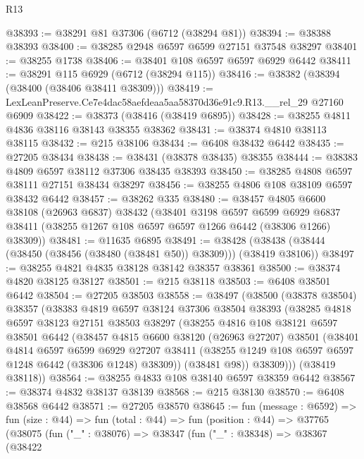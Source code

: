 \begin{lexlean}{R13}
\begin{coremodule}
@38393 := @38291 @81 @37306 (@6712 (@38294 @81))
@38394 := @38388 @38393
@38400 := @38285 @2948 @6597 @6599 @27151 @37548 @38297
@38401 := @38255 @1738
@38406 := @38401 @108 @6597 @6597 @6929 @6442
@38411 := @38291 @115 @6929 (@6712 (@38294 @115))
@38416 := @38382 (@38394 (@38400 (@38406 @38411 @38309)))
@38419 := LexLeanPreserve.Ce7e4dac58aefdeaa5aa58370d36e91c9.R13.__rel_29 @27160 @6909
@38422 := @38373 (@38416 (@38419 @6895))
@38428 := @38255 @4811 @4836 @38116 @38143 @38355 @38362
@38431 := @38374 @4810 @38113 @38115
@38432 := @215 @38106
@38434 := @6408 @38432 @6442
@38435 := @27205 @38434
@38438 := @38431 (@38378 @38435) @38355
@38444 := @38383 @4809 @6597 @38112 @37306 @38435 @38393
@38450 := @38285 @4808 @6597 @38111 @27151 @38434 @38297
@38456 := @38255 @4806 @108 @38109 @6597 @38432 @6442
@38457 := @38262 @335
@38480 := @38457
    @4805
    @6600
    @38108
    (@26963 @6837)
    @38432
    (@38401
      @3198
      @6597
      @6599
      @6929
      @6837
      @38411
      (@38255 @1267 @108 @6597 @6597 @1266 @6442 (@38306 @1266) @38309))
@38481 := @11635 @6895
@38491 := @38428 (@38438 (@38444 (@38450 (@38456 (@38480 (@38481 @50)) @38309))) (@38419 @38106))
@38497 := @38255 @4821 @4835 @38128 @38142 @38357 @38361
@38500 := @38374 @4820 @38125 @38127
@38501 := @215 @38118
@38503 := @6408 @38501 @6442
@38504 := @27205 @38503
@38558 := @38497
    (@38500
      (@38378 @38504)
      @38357
      (@38383
        @4819
        @6597
        @38124
        @37306
        @38504
        @38393
        (@38285
          @4818
          @6597
          @38123
          @27151
          @38503
          @38297
          (@38255
            @4816
            @108
            @38121
            @6597
            @38501
            @6442
            (@38457
              @4815
              @6600
              @38120
              (@26963 @27207)
              @38501
              (@38401
                @4814
                @6597
                @6599
                @6929
                @27207
                @38411
                (@38255 @1249 @108 @6597 @6597 @1248 @6442 (@38306 @1248) @38309))
              (@38481 @98))
            @38309)))
      (@38419 @38118))
@38564 := @38255 @4833 @108 @38140 @6597 @38359 @6442
@38567 := @38374 @4832 @38137 @38139
@38568 := @215 @38130
@38570 := @6408 @38568 @6442
@38571 := @27205 @38570
@38645 := fun (message : @6592) =>
  fun (size : @44) =>
  fun (total : @44) =>
  fun (position : @44) =>
  @37765
    (@38075
      (fun ("_" : @38076) =>
      @38347
        (fun ("_" : @38348) =>
        @38367
          (@38422

\end{coremodule}
\end{lexlean}
